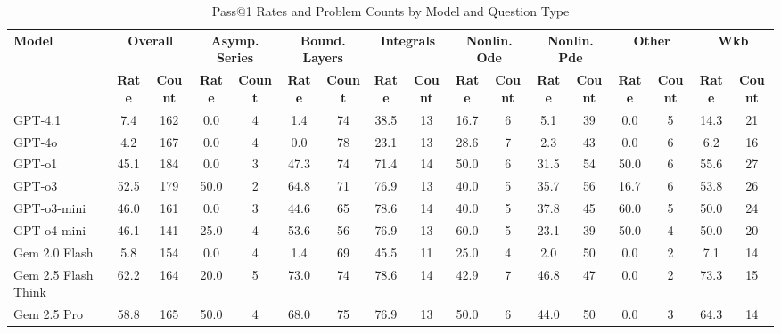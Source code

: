 \documentclass{article}
\begin{document}
\small
\begin{table}[h]
\centering
\setlength{\tabcolsep}{4pt}
\begin{tabular}{|l||c|c|c|c|c|c|c|c|c|c|c|c|c|c|c|c|}
\hline
\textbf{Model} & \multicolumn{2}{c|}{\textbf{Overall}} & \multicolumn{2}{c|}{\textbf{Asymp. Series}} & \multicolumn{2}{c|}{\textbf{Bound. Layers}} & \multicolumn{2}{c|}{\textbf{Integrals}} & \multicolumn{2}{c|}{\textbf{Nonlin. Ode}} & \multicolumn{2}{c|}{\textbf{Nonlin. Pde}} & \multicolumn{2}{c|}{\textbf{Other}} & \multicolumn{2}{c|}{\textbf{Wkb}} \\
\cline{2-17}
  & \textbf{Rate} & \textbf{Count} & \textbf{Rate} & \textbf{Count} & \textbf{Rate} & \textbf{Count} & \textbf{Rate} & \textbf{Count} & \textbf{Rate} & \textbf{Count} & \textbf{Rate} & \textbf{Count} & \textbf{Rate} & \textbf{Count} & \textbf{Rate} & \textbf{Count} \\
\hline
GPT-4.1 & 7.4 & 162 & 0.0 & 4 & 1.4 & 74 & 38.5 & 13 & 16.7 & 6 & 5.1 & 39 & 0.0 & 5 & 14.3 & 21 \\
\hline
GPT-4o & 4.2 & 167 & 0.0 & 4 & 0.0 & 78 & 23.1 & 13 & 28.6 & 7 & 2.3 & 43 & 0.0 & 6 & 6.2 & 16 \\
\hline
GPT-o1 & 45.1 & 184 & 0.0 & 3 & 47.3 & 74 & 71.4 & 14 & 50.0 & 6 & 31.5 & 54 & 50.0 & 6 & 55.6 & 27 \\
\hline
GPT-o3 & 52.5 & 179 & 50.0 & 2 & 64.8 & 71 & 76.9 & 13 & 40.0 & 5 & 35.7 & 56 & 16.7 & 6 & 53.8 & 26 \\
\hline
GPT-o3-mini & 46.0 & 161 & 0.0 & 3 & 44.6 & 65 & 78.6 & 14 & 40.0 & 5 & 37.8 & 45 & 60.0 & 5 & 50.0 & 24 \\
\hline
GPT-o4-mini & 46.1 & 141 & 25.0 & 4 & 53.6 & 56 & 76.9 & 13 & 60.0 & 5 & 23.1 & 39 & 50.0 & 4 & 50.0 & 20 \\
\hline
Gem 2.0 Flash & 5.8 & 154 & 0.0 & 4 & 1.4 & 69 & 45.5 & 11 & 25.0 & 4 & 2.0 & 50 & 0.0 & 2 & 7.1 & 14 \\
\hline
Gem 2.5 Flash Think & 62.2 & 164 & 20.0 & 5 & 73.0 & 74 & 78.6 & 14 & 42.9 & 7 & 46.8 & 47 & 0.0 & 2 & 73.3 & 15 \\
\hline
Gem 2.5 Pro & 58.8 & 165 & 50.0 & 4 & 68.0 & 75 & 76.9 & 13 & 50.0 & 6 & 44.0 & 50 & 0.0 & 3 & 64.3 & 14 \\
\hline
\end{tabular}
\caption{Pass@1 Rates and Problem Counts by Model and Question Type}
\end{table}
\end{document}
